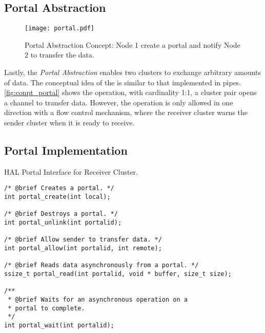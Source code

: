 		\subsection{Portal Abstraction}
		\label{sec.portal-abs}

			\begin{figure}[!tb]
				\centering%
				\caption{Portal Abstraction Concept: Node 1 create a portal and notify Node 2 to transfer the data.}%
				\label{fig:conpt_portal}%
				\texttt{[image: portal.pdf]}%
			\end{figure}


			Lastly, the \textit{Portal Abstraction} enables two clusters to exchange arbitrary
			amounts of data.
			The conceptual idea of the \portal is similar to that implemented in \posix pipes.
			\autoref{fig:conpt_portal} shows the \portal operation, with cardinality
			1:1, a cluster pair opens a channel to transfer data.
			However, the operation is only allowed in one direction with a flow control mechanism,
			where the receiver cluster warns the sender cluster when it is ready to receive.

			\subsection*{Portal Implementation}

\begin{listing}[!tb]
\caption{HAL Portal Interface for Receiver Cluster.}
\label{code:portal-receiver}
\begin{verbatim}
/* @brief Creates a portal. */
int portal_create(int local);

/* @brief Destroys a portal. */
int portal_unlink(int portalid);

/* @brief Allow sender to transfer data. */
int portal_allow(int portalid, int remote);

/* @brief Reads data asynchronously from a portal. */
ssize_t portal_read(int portalid, void * buffer, size_t size);

/**
 * @brief Waits for an asynchronous operation on a
 * portal to complete.
 */
int portal_wait(int portalid);
\end{verbatim}
\end{listing}

